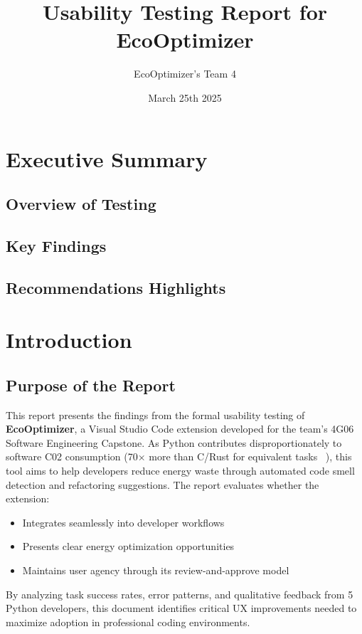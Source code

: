 \documentclass{article}
\title{Usability Testing Report for EcoOptimizer}
\author{EcoOptimizer's Team 4}
\date{March 25th 2025}
\begin{document}
\maketitle
\newpage

\tableofcontents
\newpage

\section{Executive Summary}
\subsection{Overview of Testing}
\subsection{Key Findings}
\subsection{Recommendations Highlights}
\newpage

\section{Introduction}
\subsection{Purpose of the Report}

This report presents the findings from the formal usability testing of 
\textbf{EcoOptimizer}, a Visual Studio Code extension developed for the 
team's 4G06 Software Engineering Capstone. As Python contributes 
disproportionately to software C02 consumption 
(70$\times$ more than C/Rust for equivalent tasks ~\citep{PereiraEtAl2017}), 
this tool aims to help developers reduce energy waste through automated 
code smell detection and refactoring suggestions. The report evaluates 
whether the extension:

\begin{itemize}
    \item Integrates seamlessly into developer workflows
    \item Presents clear energy optimization opportunities
    \item Maintains user agency through its review-and-approve model
\end{itemize}

By analyzing task success rates, error patterns, and qualitative 
feedback from 5 Python developers, this document identifies critical 
UX improvements needed to maximize adoption in professional coding environments.
\end{document}
